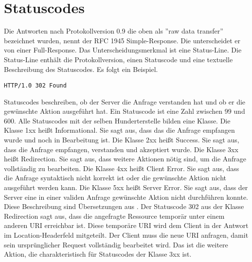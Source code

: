 \documentclass{llncs}
\begin{document}
\section{Statuscodes}
Die Antworten nach Protokollversion 0.9 die oben als ''raw data transfer'' bezeichnet wurden, nennt der RFC 1945 Simple-Response. Die unterscheidet er von einer Full-Response. Das Unterscheidungsmerkmal ist eine Status-Line. Die Status-Line enthält die Protokollversion, einen Statuscode und eine textuelle Beschreibung des Statuscodes. Es folgt ein Beispiel.
\begin{verbatim}
HTTP/1.0 302 Found
\end{verbatim}
Statuscodes beschreiben, ob der Server die Anfrage verstanden hat und ob er die gewünschte Aktion ausgeführt hat. Ein Statuscode ist eine Zahl zwischen 99 und 600. Alle Statuscodes mit der selben Hunderterstelle bilden eine Klasse.\newline
Die Klasse 1xx heißt Informational. Sie sagt aus, dass das die Anfrage empfangen wurde und noch in Bearbeitung ist.\newline
Die Klasse 2xx heißt Success. Sie sagt aus, dass die Anfrage empfangen, verstanden und akzeptiert wurde.\newline
Die Klasse 3xx heißt Redirection. Sie sagt aus, dass weitere Aktionen nötig sind, um die Anfrage vollständig zu bearbeiten.\newline
Die Klasse 4xx heißt Client Error. Sie sagt aus, dass die Anfrage syntaktisch nicht korrekt ist oder die gewünschte Aktion nicht ausgeführt werden kann.\newline
Die Klasse 5xx heißt Server Error. Sie sagt aus, dass der Server eine in einer validen Anfrage gewünschte Aktion nicht durchführen konnte. \newline
Diese Beschreibung sind Übersetzungen aus \cite{Fielding1999}. \newline
Der Statuscode 302 aus der Klasse Redirection sagt aus, dass die angefragte Ressource temporär unter einem anderen URI erreichbar ist. Diese temporäre URI wird dem Client in der Antwort im Location-Headerfeld mitgeteilt. Der Client muss die neue URI anfragen, damit sein ursprünglicher Request vollständig bearbeitet wird. Das ist die weitere Aktion, die charakteristisch für Statuscodes der Klasse 3xx ist. 
   
\end{document}
